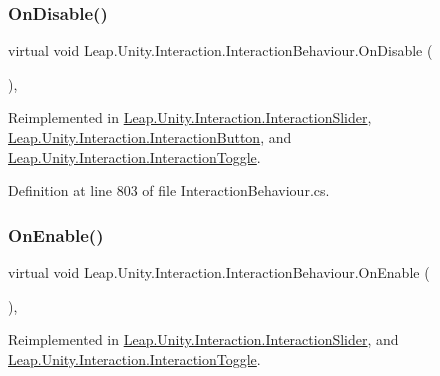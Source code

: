 \subsubsection{\texorpdfstring{OnDisable()}{OnDisable()}}
{\footnotesize\ttfamily virtual void Leap.\+Unity.\+Interaction.\+Interaction\+Behaviour.\+On\+Disable (\begin{DoxyParamCaption}{ }\end{DoxyParamCaption})\hspace{0.3cm}{\ttfamily [protected]}, {\ttfamily [virtual]}}



Reimplemented in \mbox{\hyperlink{class_leap_1_1_unity_1_1_interaction_1_1_interaction_slider_ab466b7324c426f9a77797130729ca9a6}{Leap.\+Unity.\+Interaction.\+Interaction\+Slider}}, \mbox{\hyperlink{class_leap_1_1_unity_1_1_interaction_1_1_interaction_button_a678babacbcc3d91d865ea76462a30aec}{Leap.\+Unity.\+Interaction.\+Interaction\+Button}}, and \mbox{\hyperlink{class_leap_1_1_unity_1_1_interaction_1_1_interaction_toggle_a9cbebe0123cbea22e469877317fa97ac}{Leap.\+Unity.\+Interaction.\+Interaction\+Toggle}}.



Definition at line 803 of file Interaction\+Behaviour.\+cs.

\mbox{\label{class_leap_1_1_unity_1_1_interaction_1_1_interaction_behaviour_af4b5101862906b5d2c7da28136778a8f}} 
\subsubsection{\texorpdfstring{OnEnable()}{OnEnable()}}
{\footnotesize\ttfamily virtual void Leap.\+Unity.\+Interaction.\+Interaction\+Behaviour.\+On\+Enable (\begin{DoxyParamCaption}{ }\end{DoxyParamCaption})\hspace{0.3cm}{\ttfamily [protected]}, {\ttfamily [virtual]}}



Reimplemented in \mbox{\hyperlink{class_leap_1_1_unity_1_1_interaction_1_1_interaction_slider_a0477f252b1bc1fe7a736b87624a0d951}{Leap.\+Unity.\+Interaction.\+Interaction\+Slider}}, and \mbox{\hyperlink{class_leap_1_1_unity_1_1_interaction_1_1_interaction_toggle_ac5a6bd9608c07270d3ef41feb0913bba}{Leap.\+Unity.\+Interaction.\+Interaction\+Toggle}}.



